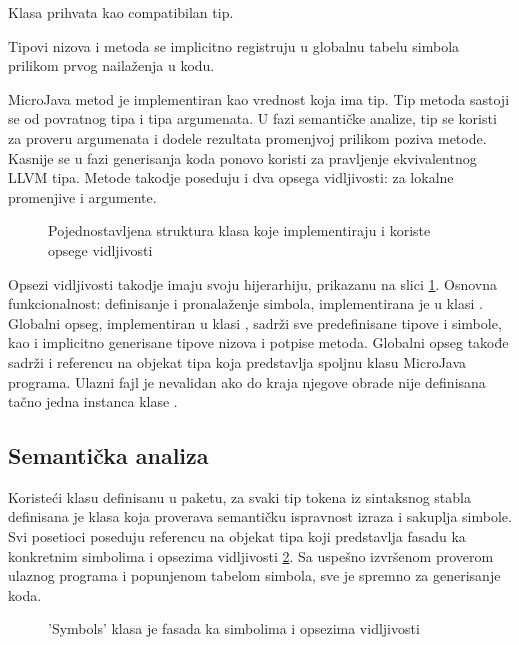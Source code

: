 Klasa  prihvata  kao compatibilan tip.

Tipovi nizova i metoda se implicitno registruju u globalnu tabelu simbola prilikom prvog nailaženja u kodu.

MicroJava metod je implementiran kao vrednost koja ima tip.
Tip metoda sastoji se od povratnog tipa i tipa argumenata. 
U fazi semantičke analize, tip se koristi za proveru argumenata i dodele rezultata promenjvoj prilikom poziva metode.
Kasnije se u fazi generisanja koda ponovo koristi za pravljenje ekvivalentnog LLVM tipa.
Metode takodje poseduju i dva opsega vidljivosti: za lokalne promenjive i argumente.

\begin{figure}[h]
	\centering
	
	\caption{Pojednostavljena struktura klasa koje implementiraju i koriste opsege vidljivosti}
	\label{fig:scopes} 
\end{figure}

Opsezi vidljivosti takodje imaju svoju hijerarhiju, prikazanu na slici \ref{fig:scopes}.
Osnovna funkcionalnost: definisanje i pronalaženje simbola, implementirana je u klasi .
Globalni opseg, implementiran u klasi , sadrži sve predefinisane tipove i simbole, kao i implicitno generisane tipove nizova i potpise metoda.
Globalni opseg takođe sadrži i referencu na objekat tipa  koja predstavlja spoljnu klasu MicroJava programa.
Ulazni fajl je nevalidan ako do kraja njegove obrade nije definisana tačno jedna instanca klase .


\subsection*{Semantička analiza}

Koristeći  klasu definisanu u  paketu, za svaki tip tokena iz sintaksnog stabla definisana je  klasa koja proverava semantičku ispravnost izraza i sakuplja simbole. 
Svi posetioci poseduju referencu na objekat tipa  koji predstavlja fasadu ka konkretnim simbolima i opsezima vidljivosti \ref{fig:symbols-facade}.
Sa uspešno izvršenom proverom ulaznog programa i popunjenom tabelom simbola, sve je spremno za generisanje koda.
\begin{figure}[h]
	\centering
	
	\caption{'Symbols' klasa je fasada ka simbolima i opsezima vidljivosti}
	\label{fig:symbols-facade}
\end{figure}


